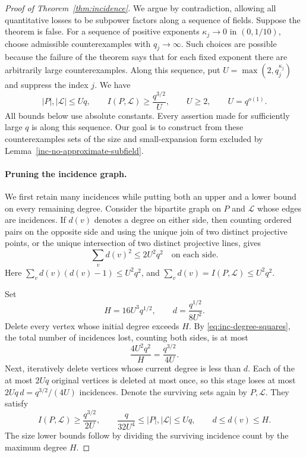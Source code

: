 \begin{proof}[Proof of Theorem~\ref{thm:incidence}]
We argue by contradiction, allowing all quantitative losses to be
subpower factors along a sequence of fields. Suppose the theorem is
false. For a sequence of positive exponents
$\kappa_j\to0$ in $(0,1/10)$, choose admissible counterexamples with
$q_j\to\infty$. Such choices are possible because the failure of
the theorem says that for each fixed exponent there are arbitrarily
large counterexamples. Along this sequence, put
$U=\max(2,q_j^{\kappa_j})$ and suppress the index $j$. We have
\begin{equation}\label{eq:inc-counterexample-sequence}
 |P|,|\mathcal L|\le Uq,\qquad
 I(P,\mathcal L)\ge\frac{q^{3/2}}{U},\qquad
 U\ge2,\qquad U=q^{o(1)}.
\end{equation}
All bounds below use absolute constants. Every assertion made for
sufficiently large $q$ is along this sequence. Our goal is to construct
from these counterexamples sets of the size and small-expansion form
excluded by Lemma~\ref{inc-no-approximate-subfield}.

\paragraph{Pruning the incidence graph.}
We first retain many incidences while putting both an upper and a
lower bound on every remaining degree. Consider the bipartite graph
on $P$ and $\mathcal L$ whose edges are incidences. If $d(v)$ denotes a degree on either side, then counting
ordered pairs on the opposite side and using the unique join of two
distinct projective points, or the unique intersection of two
distinct projective lines, gives
\begin{equation}\label{eq:inc-degree-squares}
 \sum_v d(v)^2\le2U^2q^2
 \quad\text{on each side}.
\end{equation}
Here $\sum_vd(v)(d(v)-1)\le U^2q^2$, and
$\sum_vd(v)=I(P,\mathcal L)\le U^2q^2$.

Set
\begin{equation}\label{eq:inc-degree-cutoffs}
 H=16U^3q^{1/2},\qquad d=\frac{q^{1/2}}{8U^2}.
\end{equation}
Delete every vertex whose initial degree exceeds $H$. By
\eqref{eq:inc-degree-squares}, the total number of incidences lost,
counting both sides, is at most
\[
 \frac{4U^2q^2}{H}=\frac{q^{3/2}}{4U}.
\]
Next, iteratively delete vertices whose current degree is less than
$d$. Each of the at most $2Uq$ original vertices is deleted at most
once, so this stage loses at most
$2Uq\,d=q^{3/2}/(4U)$ incidences. Denote the surviving sets again by
$P,\mathcal L$. They satisfy
\begin{equation}\label{eq:inc-pruned-bounds}
 I(P,\mathcal L)\ge\frac{q^{3/2}}{2U},\qquad
 \frac{q}{32U^4}\le |P|,|\mathcal L|\le Uq,
 \qquad d\le d(v)\le H.
\end{equation}
The size lower bounds follow by dividing the surviving incidence
count by the maximum degree $H$.


\end{proof}
